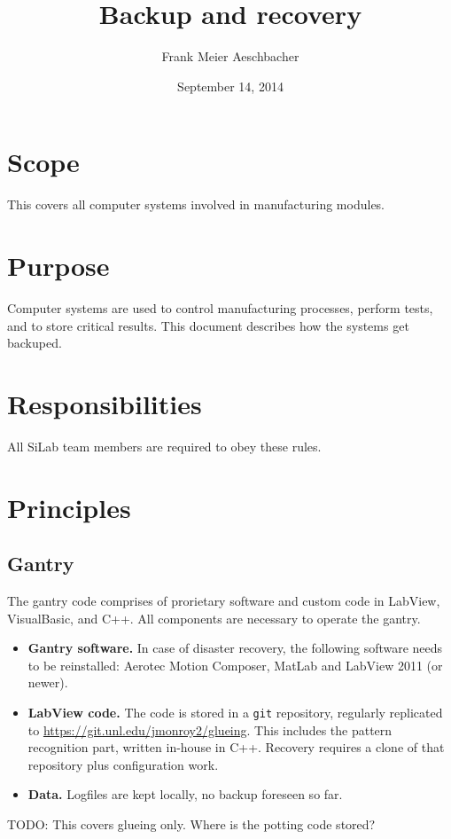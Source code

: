 \documentclass[12pt]{unlsilabsop}
\title{Backup and recovery}
\date{September 14, 2014}
\author{Frank Meier Aeschbacher}
\begin{document}
\maketitle

\section{Scope}
This covers all computer systems involved in manufacturing modules.

\section{Purpose}
Computer systems are used to control manufacturing processes, perform tests, and to store critical results. This document describes how the systems get backuped.


\section{Responsibilities}
All SiLab team members are required to obey these rules.

\section{Principles}

\subsection{Gantry}
The gantry code comprises of prorietary software and custom code in LabView, VisualBasic, and C++. All components are necessary to operate the gantry.
\begin{itemize}
    \item \textbf{Gantry software.} In case of disaster recovery, the following software needs to be reinstalled: Aerotec Motion Composer, MatLab and LabView 2011 (or newer).
    \item \textbf{LabView code.} The code is stored in a \texttt{git} repository, regularly replicated to \url{https://git.unl.edu/jmonroy2/glueing}. This includes the pattern recognition part, written in-house in C++. Recovery requires a clone of that repository plus configuration work.
    \item \textbf{Data.} Logfiles are kept locally, no backup foreseen so far.
\end{itemize}
TODO: This covers glueing only. Where is the potting code stored?
\end{document}
